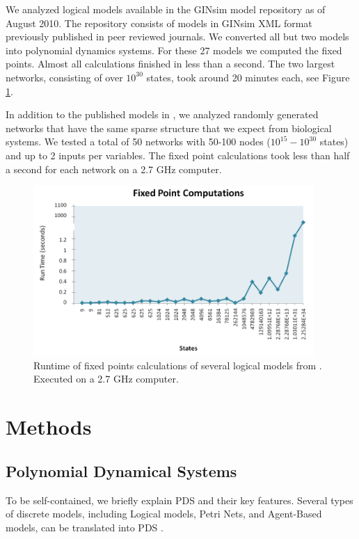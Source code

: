 \documentclass[11pt]{amsart}
\begin{document}
We analyzed logical models
available in the GINsim model repository \cite{GINsimRepo} as of August 2010. The
repository consists of models in GINsim XML format previously published in
peer reviewed journals. We converted all but two models into polynomial
dynamics systems. For these 27 models we computed the fixed points. Almost all
calculations finished in less than a second. The two largest networks,
consisting of over $10^{30}$ states, took around 20 minutes each, see 
Figure \ref{fig:chart}. 

In addition to the published models in \cite{GINsimRepo}, we analyzed 
randomly generated networks
that have the same sparse structure that we
expect from biological systems. We tested a total of 50 networks with
50-100 nodes ($10^{15} - 10^{30}$ states) and up to 2 inputs per variables. The 
fixed point calculations took less than half a second for each network on
a 2.7 GHz computer. 


\begin{figure}[htb]
  \centering
  \includegraphics[width=0.95\textwidth]{GINSimChart.png}
  \caption{Runtime of fixed points calculations of several logical models from
  \cite{GINsimRepo}. Executed on a 2.7 GHz computer.}
  \label{fig:chart}
\end{figure}

\section{Methods}
\subsection{Polynomial Dynamical Systems}
To be self-contained, we briefly explain PDS and their key features. 
Several types of discrete models, including Logical models, Petri
Nets, and Agent-Based models, can be translated into PDS \cite{Alan:Bioinf2010,Hinkelmann:2010}.
\end{document}
